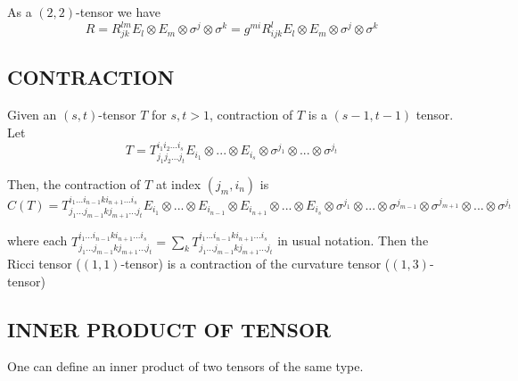 As a $(2, 2)$-tensor we have
$$
	R = R_{jk}^{lm} E_l \otimes E_m \otimes \sigma^j \otimes \sigma^k = g^{mi} R_{ijk}^l E_l \otimes E_m \otimes \sigma^j \otimes \sigma^k
$$

\subsection{CONTRACTION}

Given an $(s, t)$-tensor $T$ for $s, t > 1$, contraction of $T$ is a $(s-1, t-1)$ tensor. Let 
$$
	T = T_{j_1 j_2 ... j_t}^{i_1 i_2 ... i_s} E_{i_1} \otimes ... \otimes E_{i_s} \otimes \sigma^{j_1} \otimes ... \otimes \sigma^{j_t}
$$

Then, the contraction of $T$ at index $(j_m, i_n)$ is
$$
	C(T) = T_{j_1 ... j_{m-1} k j_{m+1} ... j_t}^{i_1 ... i_{n-1} k i_{n+1} ... i_s} E_{i_1} \otimes ... \otimes E_{i_{n-1}} \otimes E_{i_{n+1}} \otimes ... \otimes E_{i_s} \otimes \sigma^{j_1} \otimes ... \otimes \sigma^{j_{m-1}} \otimes \sigma^{j_{m+1}} \otimes ... \otimes \sigma^{j_t}
$$

where each $T_{j_1 ... j_{m-1} k j_{m+1} ... j_t}^{i_1 ... i_{n-1} k i_{n+1} ... i_s} = \sum_k T_{j_1 ... j_{m-1} k j_{m+1} ... j_t}^{i_1 ... i_{n-1} k i_{n+1} ... i_s}$ in usual notation. Then the Ricci tensor ($(1, 1)$-tensor) is a contraction of the curvature tensor ($(1, 3)$-tensor)


\subsection{INNER PRODUCT OF TENSOR}

One can define an inner product of two tensors of the same type. 




